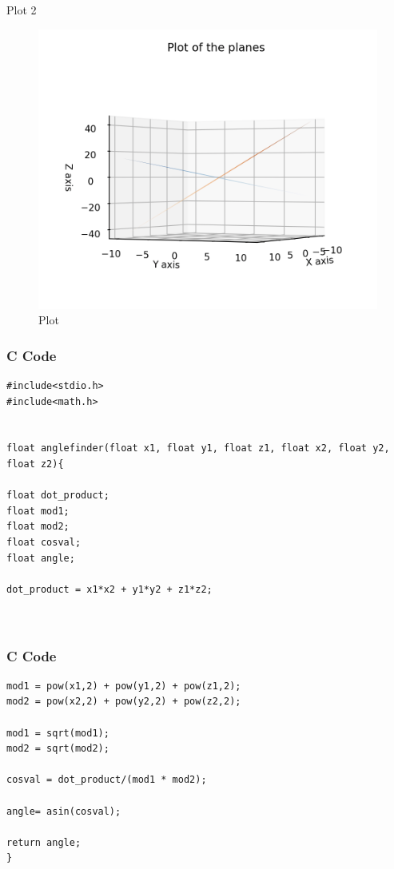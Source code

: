 \documentclass{beamer}
\begin{document}
\begin{frame}{Plot 2}
\begin{figure}
    \centering
    \includegraphics[width=0.8\columnwidth]{Figs/Figure_3.1.png}
    \caption{Plot}
    \label{fig:placeholder}
\end{figure}
\end{frame}

\begin{frame}[fragile]
\frametitle{C Code}
\begin{lstlisting}
#include<stdio.h>
#include<math.h>


float anglefinder(float x1, float y1, float z1, float x2, float y2, float z2){

float dot_product;
float mod1;
float mod2;
float cosval;
float angle;

dot_product = x1*x2 + y1*y2 + z1*z2;



\end{lstlisting}

\end{frame}

\begin{frame}[fragile]
\frametitle{C Code}
\begin{lstlisting}
mod1 = pow(x1,2) + pow(y1,2) + pow(z1,2);    
mod2 = pow(x2,2) + pow(y2,2) + pow(z2,2);
    
mod1 = sqrt(mod1);
mod2 = sqrt(mod2);
   
cosval = dot_product/(mod1 * mod2);

angle= asin(cosval);

return angle;
}

\end{lstlisting}

\end{frame}
\end{document}
